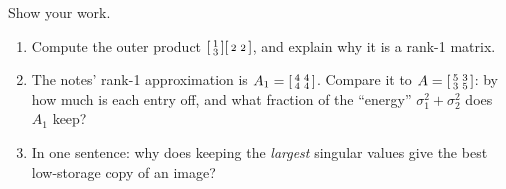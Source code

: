 \documentclass[10pt]{article}
\begin{document}
\begin{practicebox}
Show your work.
\begin{enumerate}[leftmargin=1.6em, itemsep=4pt]
  \item Compute the outer product $\begin{bsmallmatrix} 1\\3 \end{bsmallmatrix}\begin{bsmallmatrix} 2 & 2 \end{bsmallmatrix}$, and explain why it is a rank-1 matrix. 
  \item The notes' rank-1 approximation is $A_1=\begin{bsmallmatrix} 4 & 4\\ 4 & 4 \end{bsmallmatrix}$. Compare it to $A=\begin{bsmallmatrix} 5 & 3\\ 3 & 5 \end{bsmallmatrix}$: by how much is each entry off, and what fraction of the ``energy'' $\sigma_1^2+\sigma_2^2$ does $A_1$ keep? 
  \item In one sentence: why does keeping the \emph{largest} singular values give the best low-storage copy of an image? 
\end{enumerate}
\end{practicebox}
\end{document}
